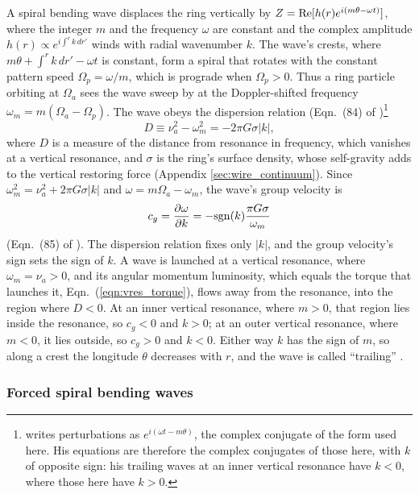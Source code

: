 \documentclass[twocolumn]{aastex702}
\begin{document}
A spiral bending wave displaces the ring vertically by $Z = {\rm Re}[h(r)e^{i(m\theta - \omega t)}]$, where the
integer $m$ and the frequency $\omega$ are constant and the complex amplitude $h(r) \propto e^{i\int^r k\,dr'}$ winds
with radial wavenumber $k$. The wave's crests, where $m\theta + \int^r k\,dr' - \omega t$ is constant, form a
spiral that rotates with the constant pattern speed $\Omega_p = \omega/m$, which is prograde when $\Omega_p > 0$.
Thus a ring particle orbiting at $\Omega_a$ sees the wave sweep by at the Doppler-shifted frequency
$\omega_m = m(\Omega_a - \Omega_p)$. The wave obeys the dispersion
relation (Eqn.\ (84) of \citealt{S84})\footnote{\cite{S84} writes perturbations as $e^{i(\omega t - m\theta)}$,
the complex conjugate of the form used here. His equations are therefore the complex conjugates of those here, with
$k$ of opposite sign: his trailing waves at an inner vertical resonance have $k < 0$, where those here have $k > 0$.}
\begin{equation}
    \label{eqn:bw_disp}
    D \equiv \nu_a^2 - \omega_m^2 = -2\pi G\sigma|k|,
\end{equation}
where $D$ is a measure of the distance from resonance in frequency, which vanishes at a vertical resonance, and
$\sigma$ is the ring's surface density, whose self-gravity adds to the vertical restoring force
(Appendix \ref{sec:wire_continuum}). Since $\omega_m^2 = \nu_a^2 + 2\pi G\sigma|k|$ and
$\omega = m\Omega_a - \omega_m$, the wave's group velocity is
\begin{equation}
    \label{eqn:bw_cg}
    c_g = \frac{\partial\omega}{\partial k} = -{\rm sgn}(k)\frac{\pi G\sigma}{\omega_m}
\end{equation}
(Eqn.\ (85) of \citealt{S84}). The dispersion relation fixes only $|k|$, and the group velocity's sign sets the
sign of $k$. A wave is launched at a vertical resonance, where $\omega_m = \nu_a > 0$, and its angular momentum
luminosity, which equals the torque that launches it, Eqn.\ (\ref{eqn:vres_torque}), flows away from the
resonance, into the region where $D < 0$. At an inner vertical resonance, where $m > 0$, that region
lies inside the resonance, so $c_g < 0$ and $k > 0$; at an outer vertical resonance, where $m < 0$, it lies
outside, so $c_g > 0$ and $k < 0$. Either way $k$ has the sign of $m$, so along a crest the longitude
$\theta$ decreases with $r$, and the wave is called ``trailing'' \citep{S84}.

\subsubsection{Forced spiral bending waves}
\label{sec:waves_theory}
\end{document}
